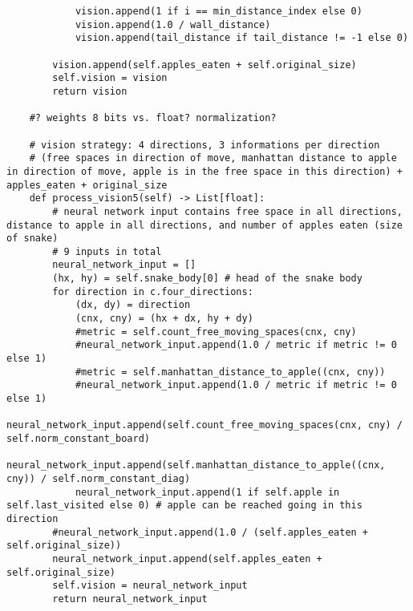 \documentclass[11pt,a4paper]{article}
\begin{document}
\begin{verbatim}
            vision.append(1 if i == min_distance_index else 0)
            vision.append(1.0 / wall_distance)
            vision.append(tail_distance if tail_distance != -1 else 0)

        vision.append(self.apples_eaten + self.original_size)
        self.vision = vision
        return vision

    #? weights 8 bits vs. float? normalization?

    # vision strategy: 4 directions, 3 informations per direction
    # (free spaces in direction of move, manhattan distance to apple in direction of move, apple is in the free space in this direction) + apples_eaten + original_size
    def process_vision5(self) -> List[float]:
        # neural network input contains free space in all directions, distance to apple in all directions, and number of apples eaten (size of snake)
        # 9 inputs in total
        neural_network_input = []
        (hx, hy) = self.snake_body[0] # head of the snake body
        for direction in c.four_directions:
            (dx, dy) = direction
            (cnx, cny) = (hx + dx, hy + dy)
            #metric = self.count_free_moving_spaces(cnx, cny)
            #neural_network_input.append(1.0 / metric if metric != 0 else 1)
            #metric = self.manhattan_distance_to_apple((cnx, cny))
            #neural_network_input.append(1.0 / metric if metric != 0 else 1)
            neural_network_input.append(self.count_free_moving_spaces(cnx, cny) / self.norm_constant_board)
            neural_network_input.append(self.manhattan_distance_to_apple((cnx, cny)) / self.norm_constant_diag)
            neural_network_input.append(1 if self.apple in self.last_visited else 0) # apple can be reached going in this direction
        #neural_network_input.append(1.0 / (self.apples_eaten + self.original_size))
        neural_network_input.append(self.apples_eaten + self.original_size)
        self.vision = neural_network_input
        return neural_network_input


\end{verbatim}
\end{document}

